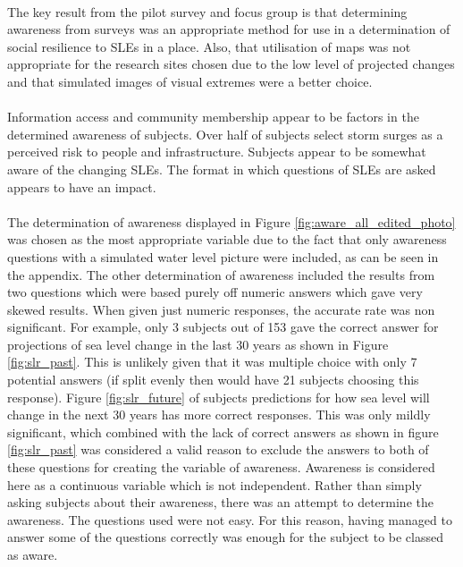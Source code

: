 \paragraph{}
The key result from the pilot survey and focus group is that determining awareness from surveys was an appropriate method for use in a determination of social resilience to SLEs in a place. Also, that utilisation of maps was not appropriate for the research sites chosen due to the low level of projected changes and that simulated images of visual extremes were a better choice.
\paragraph{}
Information access and community membership appear to be factors in the determined awareness of subjects. Over half of subjects select storm surges as a perceived risk to people and infrastructure. Subjects appear to be somewhat aware of the changing SLEs. The format in which questions of SLEs are asked appears to have an impact. 

\paragraph{}
The determination of awareness displayed in Figure \ref{fig:aware_all_edited_photo} was chosen as the most appropriate variable due to the fact that only awareness questions with a simulated water level picture were included, as can be seen in the appendix. The other determination of awareness included the results from two questions which were based purely off numeric answers which gave very skewed results. When given just numeric responses, the accurate rate was non significant. For example, only 3 subjects out of 153 gave the correct answer for projections of sea level change in the last 30 years as shown in Figure \ref{fig:slr_past}.  This is unlikely given that it was multiple choice with only 7 potential answers (if split evenly then would have 21 subjects choosing this response). Figure \ref{fig:slr_future} of subjects predictions for how sea level will change in the next 30 years has more correct responses. This was only mildly significant, which combined with the lack of correct answers as shown in figure \ref{fig:slr_past} was considered a valid reason to exclude the answers to both of these questions for creating the variable of awareness. Awareness is considered here as a continuous variable which is not independent. Rather than simply asking subjects about their awareness, there was an attempt to determine the awareness. The questions used were not easy. For this reason, having managed to answer some of the questions correctly was enough for the subject to be classed as aware.

